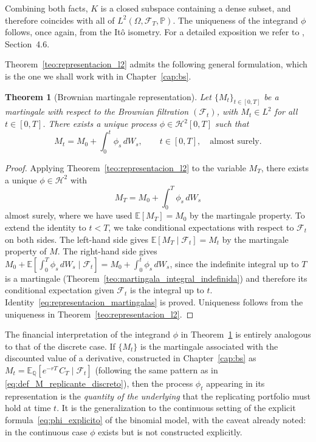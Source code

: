 \documentclass[11pt,a4paper,oneside]{report}
\theoremstyle{plain}
\newtheorem{teorema}{Theorem}[chapter]
\theoremstyle{definition}
\theoremstyle{remark}
\newcommand{\E}{\mathbb{E}}
\newcommand{\PP}{\mathbb{P}}
\newcommand{\Q}{\mathbb{Q}}
\newcommand{\F}{\mathcal{F}}
\newcommand{\1}{\mathbf{1}}
\begin{document}
Combining both facts, $K$ is a closed subspace containing a dense
subset, and therefore coincides with all of
$L^2(\Omega, \F_T, \PP)$. The uniqueness of the integrand $\phi$
follows, once again, from the Itô isometry. For a detailed
exposition we refer to \cite{etheridge}, Section~4.6.

Theorem~\ref{teo:representacion_l2} admits the following general
formulation, which is the one we shall work with in
Chapter~\ref{cap:bs}.

\begin{teorema}[Brownian martingale representation]
\label{teo:representacion_martingalas}
Let $\{M_t\}_{t \in [0, T]}$ be a martingale with respect to the
Brownian filtration $(\F_t)$, with $M_t \in L^2$ for all
$t \in [0, T]$. There exists a unique process
$\phi \in \mathcal{H}^2[0, T]$ such that
\begin{equation}\label{eq:representacion_martingalas}
  M_t = M_0 + \int_0^t \phi_s\, dW_s,
  \qquad t \in [0, T],
  \quad \text{almost surely}.
\end{equation}
\end{teorema}

\begin{proof}
Applying Theorem~\ref{teo:representacion_l2} to the variable $M_T$,
there exists a unique $\phi \in \mathcal{H}^2$ with
\begin{equation*}
  M_T = M_0 + \int_0^T \phi_s\, dW_s
\end{equation*}
almost surely, where we have used $\E[M_T] = M_0$ by the martingale
property. To extend the identity to $t < T$, we take conditional
expectations with respect to $\F_t$ on both sides. The left-hand side
gives $\E[M_T \mid \F_t] = M_t$ by the martingale property of $M$.
The right-hand side gives
$M_0 + \E[\int_0^T \phi_s\, dW_s \mid \F_t] = M_0 + \int_0^t \phi_s\, dW_s$,
since the indefinite integral up to $T$ is a martingale
(Theorem~\ref{teo:martingala_integral_indefinida}) and therefore its
conditional expectation given $\F_t$ is the integral up to $t$.
Identity~\eqref{eq:representacion_martingalas} is proved. Uniqueness
follows from the uniqueness in Theorem~\ref{teo:representacion_l2}.
\end{proof}

The financial
interpretation of the integrand $\phi$ in
Theorem~\ref{teo:representacion_martingalas} is entirely analogous to
that of the discrete case. If $\{M_t\}$ is the martingale associated
with the discounted value of a derivative, constructed in
Chapter~\ref{cap:bs} as $M_t = \E_\Q[e^{-rT}\, C_T \mid \F_t]$
(following the same pattern as in
\eqref{eq:def_M_replicante_discreto}), then the process $\phi_t$
appearing in its representation is the \emph{quantity of the
underlying} that the replicating portfolio must hold at time $t$. It
is the generalization to the continuous setting of the explicit
formula~\eqref{eq:phi_explicito} of the binomial model, with the
caveat already noted: in the continuous case $\phi$ exists but is not
constructed explicitly.
\end{document}
